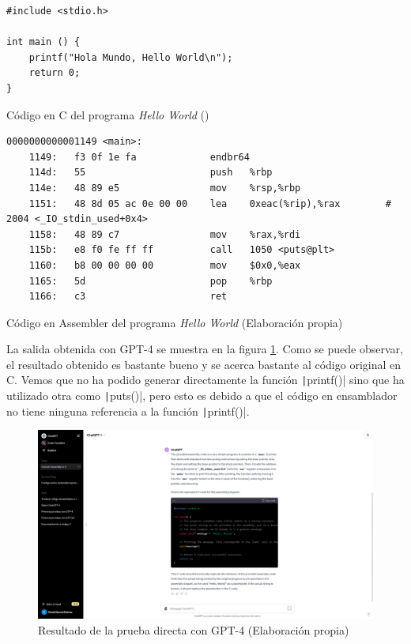 \begin{mycode}
    \begin{verbatim}
#include <stdio.h>

int main () {
    printf("Hola Mundo, Hello World\n");
    return 0;
}
    \end{verbatim}
    \caption[Código en C del programa \textit{Hello World}]{Código en C del programa \textit{Hello World} (\cite{HolaMundoCode})}
    \label{cod:helloWorldC}
\end{mycode}

\begin{mycode}
    \begin{verbatim}
0000000000001149 <main>:
    1149:	f3 0f 1e fa          	endbr64
    114d:	55                   	push   %rbp
    114e:	48 89 e5             	mov    %rsp,%rbp
    1151:	48 8d 05 ac 0e 00 00 	lea    0xeac(%rip),%rax        # 2004 <_IO_stdin_used+0x4>
    1158:	48 89 c7             	mov    %rax,%rdi
    115b:	e8 f0 fe ff ff       	call   1050 <puts@plt>
    1160:	b8 00 00 00 00       	mov    $0x0,%eax
    1165:	5d                   	pop    %rbp
    1166:	c3                   	ret
    \end{verbatim}
    \caption[Código en Assembler del programa \textit{Hello World}]{Código en Assembler del programa \textit{Hello World} (Elaboración propia)}
    \label{cod:helloWorldAsm}
\end{mycode}

La salida obtenida con GPT-4 se muestra en la figura \ref{fig:resultado_gpt4_directo}. Como se puede
observar, el resultado obtenido es bastante bueno y se acerca bastante al código original en C. Vemos
que no ha podido generar directamente la función \texttt|printf()| sino que ha utilizado
otra como \texttt|puts()|, pero esto es debido a que el código en ensamblador no tiene
ninguna referencia a la función \texttt|printf()|.

\begin{figure}[H]
    \begin{center}
      \includegraphics[scale=0.3]{figuras/Capitulo_12/ResultadoDirectoGPT4.png}
    \end{center}
    \caption[Resultado de la prueba directa con GPT-4]{Resultado de la prueba directa con GPT-4 (Elaboración propia)}
    \label{fig:resultado_gpt4_directo}
\end{figure}

